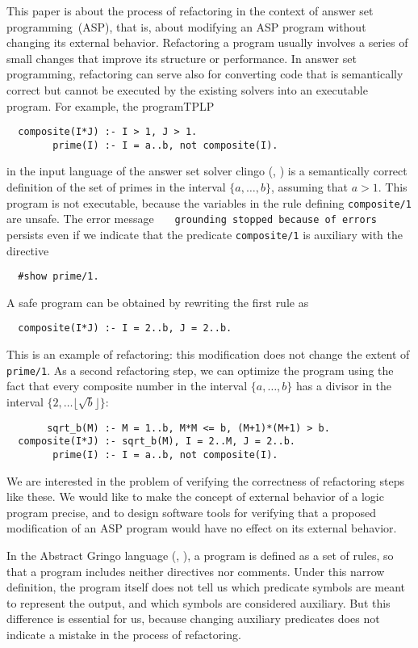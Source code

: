 \documentclass{tlp}
\def\citeb#1{(\citeauthor{#1}, \citeyear{#1})}
\begin{document}
This paper is about the process of refactoring in the context of answer set
programming~(ASP),
that is, about modifying an ASP program without changing
its external behavior.  Refactoring a program usually involves a series of
small changes that improve its structure or performance.  In answer set
programming, refactoring can serve also for converting code that is
semantically correct but cannot be executed by the existing solvers into an
executable program.  For example, the programTPLP
\begin{verbatim}
  composite(I*J) :- I > 1, J > 1.
        prime(I) :- I = a..b, not composite(I).
\end{verbatim}
in the input language of the answer set solver {\sc clingo} \citeb{geb12}
is a semantically correct definition of the set of primes in the
interval $\{a,\dots,b\}$, assuming that $a>1$.  This program
is not executable, because the variables in
the rule defining \verb|composite/1| are unsafe.  The error message
~~~{\tt  grounding stopped because of errors
}~~~%
persists even if we indicate that the predicate
\verb|composite/1| is auxiliary with the directive
\begin{verbatim}
  #show prime/1.
\end{verbatim}
A safe program can be obtained by rewriting the first rule as
\begin{verbatim}
  composite(I*J) :- I = 2..b, J = 2..b.
\end{verbatim}
This is an example of refactoring: this modification
does not change the extent of \verb|prime/1|.
As a second refactoring step, we can optimize the program using the
fact that every composite
number in the interval $\{a,\dots,b\}$ has a divisor in the interval
$\{2,\dots\lfloor \sqrt b\rfloor\}$:
\begin{verbatim}
       sqrt_b(M) :- M = 1..b, M*M <= b, (M+1)*(M+1) > b.
  composite(I*J) :- sqrt_b(M), I = 2..M, J = 2..b.
        prime(I) :- I = a..b, not composite(I).
\end{verbatim}

We are interested in the problem of verifying the correctness of
refactoring steps like these. We would like to make the concept of external
behavior of a logic program precise, and to
design software tools for verifying that a proposed modification of an
ASP program would have no effect on its external behavior.

In the Abstract Gringo language \citeb{geb15}, a program is defined as
a set of rules, so that a program
includes neither directives nor comments.  Under this narrow definition,
the program itself does not tell us which predicate symbols are meant to
represent the output, and which symbols are considered
auxiliary.  But this difference is essential for us, because changing
auxiliary predicates does not indicate a mistake in the process of
refactoring.
\end{document}
